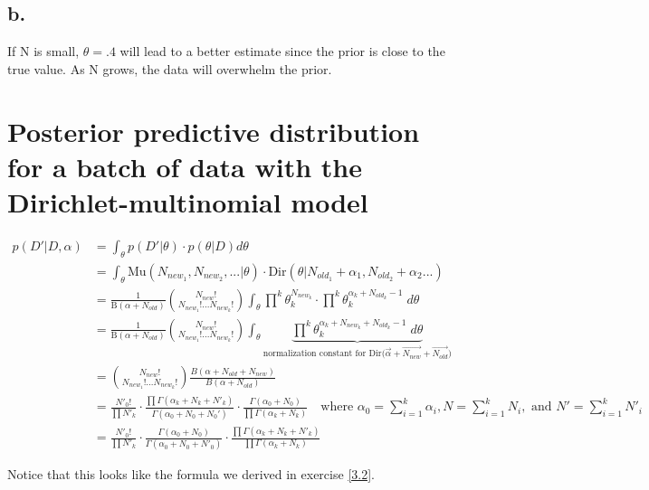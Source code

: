 \documentclass{article}
\begin{document}
\subsection{b.}
If N is small, $\theta = .4$ will lead to a better estimate since the
prior is close to the true value. As N grows, the data will overwhelm
the prior.

\section{Posterior predictive distribution for a batch of data with
the Dirichlet-multinomial model}

\begin{align*}
  p(D'|D,\alpha) &= \int_\theta p(D'|\theta) \cdot p(\theta|D) d\theta
  \\
                 &= \int_\theta \text{Mu}(N_{new_1}, N_{new_2},...|\theta) \cdot
                   \text{Dir}(\theta|N_{old_1} + \alpha_1, N_{old_2} + \alpha_2 ...)
  \\
                 &= \frac{1}{\text{B}(\alpha + N_{old})} {N_{new}!
                   \choose N_{new_1}! ... N_{new_k}!} \int_{\theta}
                   \prod^k \theta_k^{N_{new_k}} \cdot \prod^k
                   \theta_k^{\alpha_k + N_{old_k}
                   - 1} \; d\theta \\
                 &= \frac{1}{\text{B}(\alpha + N_{old})} {N_{new}!
                   \choose N_{new_1}! ... N_{new_k}!} \int_{\theta} \underbrace{
                   \prod^k \theta_k^{\alpha_k + N_{new_k} + N_{old_k}
                   - 1} \; d\theta}_{\text{normalization constant for
                   Dir($\vec{\alpha} + \vec{N_{new}} +
                   \vec{N_{old}}$)}} \\
                 &= {N_{new}! \choose N_{new_1}! ... N_{new_k}!}
                   \frac{B(\alpha + N_{old} + N_{new})}{B(\alpha +
                   N_{old})} \\
                 &= \frac{N'_0!}{\prod N'_k} \cdot \frac{\prod
                   \Gamma(\alpha_k + N_k + N'_k)}{\Gamma(\alpha_0 + N_0
                   + N_0')} \cdot \frac{\Gamma(\alpha_0 + N_0)}{\prod
                   \Gamma(\alpha_k + N_k)} \quad \text{where
                   $\alpha_0 = \sum_{i=1}^k \alpha_i, N = \sum_{i=1}^k
                   N_i, \text{ and } N' = \sum_{i=1}^k N'_i$} \\
                 &= \frac{N'_0!}{\prod N'_k} \cdot \frac{\Gamma(\alpha_0 +
                   N_0)}{\Gamma(\alpha_0 + N_0 + N'_0)} \cdot
                   \frac{\prod \Gamma(\alpha_k + N_k + N'_k)}{\prod
                   \Gamma(\alpha_k + N_k)}
\end{align*}

Notice that this looks like the formula we derived in exercise \ref{3.2}.
\end{document}

